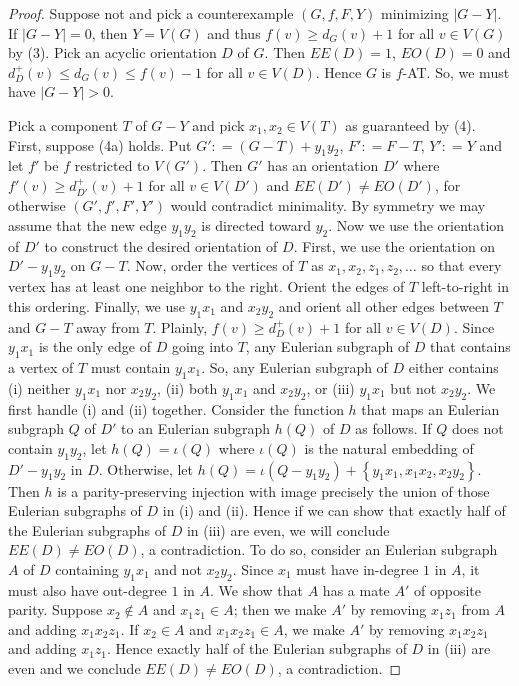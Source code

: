 \documentclass[12pt]{article}
\theoremstyle{plain}
\theoremstyle{definition}
\theoremstyle{remark}
\newcommand{\set}[1]{\left\{ #1 \right\}}
\newcommand{\card}[1]{\left|#1\right|}
\newcommand{\parens}[1]{\left( #1 \right)}
\newcommand{\DefinedAs}{\mathrel{\mathop:}=}
\begin{document}
\begin{proof}
	Suppose not and pick a counterexample $\parens{G, f, F, Y}$ minimizing $\card{G-Y}$. %
	If $\card{G-Y} = 0$, then $Y = V(G)$ and thus $f(v) \ge d_G(v) + 1$ for all $v \in V(G)$ by (3).  Pick an acyclic orientation $D$ of $G$.  Then $EE(D) = 1$, $EO(D) = 0$ and $d_D^+(v) \le d_G(v) \le f(v) - 1$ for all $v \in V(D)$. Hence $G$ is $f$-AT.  So, we must have $\card{G-Y} > 0$.  
	
	Pick a component $T$ of $G - Y$ and pick $x_1, x_2 \in V(T)$ as guaranteed by (4). First, suppose (4a) holds.   Put $G' \DefinedAs (G - T) + y_1y_2$, $F' \DefinedAs F - T$, $Y' \DefinedAs Y$ and let $f'$ be $f$ restricted to $V(G')$.  Then $G'$ has an orientation $D'$ where $f'(v) \ge d_{D'}^+(v) + 1$ for all $v \in V(D')$ and $EE(D') \ne EO(D')$, for otherwise $\parens{G', f', F', Y'}$ would contradict minimality.  By symmetry we may assume that the new edge $y_1y_2$ is directed toward $y_2$.  Now we use the orientation of $D'$ to construct the desired orientation of $D$. First, we use the orientation on $D' - y_1y_2$ on $G-T$. Now, order the vertices of $T$ as $x_1, x_2, z_1, z_2, \ldots$ so that every vertex has at least one neighbor to the right.  Orient the edges of $T$ left-to-right in this ordering.  Finally, we use $y_1x_1$ and $x_2y_2$ and orient all other edges between $T$ and $G-T$ away from $T$.  Plainly, $f(v) \ge d_{D}^+(v) + 1$ for all $v \in V(D)$.  Since $y_1x_1$ is the only edge of $D$ going into $T$, any Eulerian subgraph of $D$ that contains a vertex of $T$ must contain $y_1x_1$.  So, any Eulerian subgraph of $D$ either contains (i) neither $y_1x_1$ nor $x_2y_2$, (ii) both $y_1x_1$ and $x_2y_2$, or (iii) $y_1x_1$ but not $x_2y_2$.  We first handle (i) and (ii) together.  Consider the function $h$ that maps an Eulerian subgraph $Q$ of $D'$ to an Eulerian subgraph $h(Q)$ of $D$ as follows.  If $Q$ does not contain $y_1y_2$, let $h(Q) = \iota(Q)$ where $\iota(Q)$ is the natural embedding of $D' - y_1y_2$ in $D$.  Otherwise, let $h(Q) = \iota(Q - y_1y_2) + \set{y_1x_1, x_1x_2, x_2y_2}$.  Then $h$ is a parity-preserving injection with image precisely the union of those Eulerian subgraphs of $D$ in (i) and (ii).  Hence if we can show that exactly half of the Eulerian subgraphs of $D$ in (iii) are even, we will conclude $EE(D) \ne EO(D)$, a contradiction.  To do so, consider an Eulerian subgraph $A$ of $D$ containing $y_1x_1$ and not $x_2y_2$. Since $x_1$ must have in-degree $1$ in $A$, it must also have out-degree $1$ in $A$.  We show that $A$ has a mate $A'$ of opposite parity.  Suppose $x_2 \not \in A$ and $x_1z_1 \in A$; then we make $A'$ by removing $x_1z_1$ from $A$ and adding $x_1x_2z_1$.  If $x_2 \in A$ and $x_1x_2z_1 \in A$, we make $A'$ by removing $x_1x_2z_1$ and adding $x_1z_1$. Hence exactly half of the Eulerian subgraphs of $D$ in (iii) are even and we conclude $EE(D) \ne EO(D)$, a contradiction.
	

\end{proof}
\end{document}
